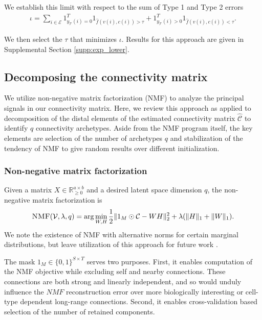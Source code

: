 We establish this limit with respect to the sum of Type 1 and Type 2 errors
\begin{eqnarray*}
\iota = \sum_{i \in \mathcal E} 1_{y_{\mathcal T}(i) = 0}^T 1_{\hat f(v(i),c(i)) > \tau} + 1_{y_{\mathcal T}(i) > 0}^T 1_{\hat f(v(i),c(i)) < \tau}  .
\end{eqnarray*}

We then select the $\tau$ that minimizes $\iota$.
Results for this approach are given in Supplemental Section \ref{supp:exp_lower}.

\newpage

\subsection{Decomposing the connectivity matrix}
\label{supp_sec:matrix_factor_methods}

We utilize non-negative matrix factorization (NMF) to analyze the principal signals in our connectivity matrix.
Here, we review this approach as applied to decomposition of the distal elements of the estimated connectivity matrix $\widehat {\mathcal C}$ to identify $q$ connectivity archetypes.
Aside from the NMF program itself, the key elements are selection of the number of archetypes $q$ and stabilization of the tendency of NMF to give random results over different initialization. 

\subsubsection{Non-negative matrix factorization}

Given a matrix $X \in \mathbb R_{\geq 0}^{a \times b}$ and a desired latent space dimension $q$, the non-negative matrix factorization is
\begin{eqnarray*}
\textsc{NMF}(\mathcal V, \lambda, q) = \arg \min_{W, H} \frac{1}{2}\| 1_{M} \odot \mathcal C - WH\|_2^2  + \lambda  (\|H \|_1 + \|W \|_1) .
\end{eqnarray*}
We note the existence of NMF with alternative norms for certain marginal distributions, but leave utilization of this approach for future work \citep{Brunet2004-gi}.

The mask $1_M \in \{0,1\}^{S \times T}$ serves two purposes.
First, it enables computation of the NMF objective while excluding self and nearby connections.
These connections are both strong and linearly independent, and so would unduly influence the $NMF$ reconstruction error over more biologically interesting or cell-type dependent long-range connections.
Second, it enables cross-validation based selection of the number of retained components.

